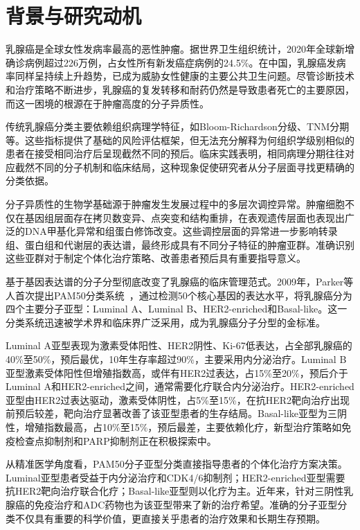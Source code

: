 \section{背景与研究动机}

乳腺癌是全球女性发病率最高的恶性肿瘤。据世界卫生组织统计，2020年全球新增确诊病例超过226万例，占女性所有新发癌症病例的24.5\%。在中国，乳腺癌发病率同样呈持续上升趋势，已成为威胁女性健康的主要公共卫生问题。尽管诊断技术和治疗策略不断进步，乳腺癌的复发转移和耐药仍然是导致患者死亡的主要原因，而这一困境的根源在于肿瘤高度的分子异质性。

传统乳腺癌分类主要依赖组织病理学特征，如Bloom-Richardson分级、TNM分期等。这些指标提供了基础的风险评估框架，但无法充分解释为何组织学级别相似的患者在接受相同治疗后呈现截然不同的预后。临床实践表明，相同病理分期往往对应截然不同的分子机制和临床结局，这种现象促使研究者从分子层面寻找更精确的分类依据。

分子异质性的生物学基础源于肿瘤发生发展过程中的多层次调控异常。肿瘤细胞不仅在基因组层面存在拷贝数变异、点突变和结构重排，在表观遗传层面也表现出广泛的DNA甲基化异常和组蛋白修饰改变。这些调控层面的异常进一步影响转录组、蛋白组和代谢层的表达谱，最终形成具有不同分子特征的肿瘤亚群。准确识别这些亚群对于制定个体化治疗策略、改善患者预后具有重要指导意义。

基于基因表达谱的分子分型彻底改变了乳腺癌的临床管理范式。2009年，Parker等人首次提出PAM50分类系统~\cite{pam50}，通过检测50个核心基因的表达水平，将乳腺癌分为四个主要分子亚型：Luminal A、Luminal B、HER2-enriched和Basal-like。这一分类系统迅速被学术界和临床界广泛采用，成为乳腺癌分子分型的金标准。

Luminal A亚型表现为激素受体阳性、HER2阴性、Ki-67低表达，占全部乳腺癌的40\%至50\%，预后最优，10年生存率超过90\%，主要采用内分泌治疗。Luminal B亚型激素受体阳性但增殖指数高，或伴有HER2过表达，占15\%至20\%，预后介于Luminal A和HER2-enriched之间，通常需要化疗联合内分泌治疗。HER2-enriched亚型由HER2过表达驱动，激素受体阴性，占5\%至15\%，在抗HER2靶向治疗出现前预后较差，靶向治疗显著改善了该亚型患者的生存结局。Basal-like亚型为三阴性，增殖指数最高，占10\%至15\%，预后最差，主要依赖化疗，新型治疗策略如免疫检查点抑制剂和PARP抑制剂正在积极探索中。

从精准医学角度看，PAM50分子亚型分类直接指导患者的个体化治疗方案决策。Luminal亚型患者受益于内分泌治疗和CDK4/6抑制剂；HER2-enriched亚型需要抗HER2靶向治疗联合化疗；Basal-like亚型则以化疗为主。近年来，针对三阴性乳腺癌的免疫治疗和ADC药物也为该亚型带来了新的治疗希望。准确的分子亚型分类不仅具有重要的科学价值，更直接关乎患者的治疗效果和长期生存预期。

